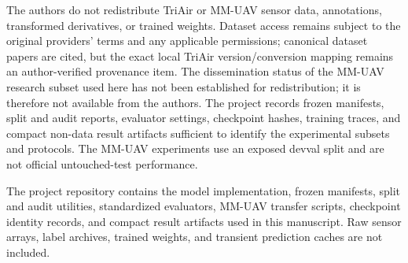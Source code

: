 The authors do not redistribute TriAir or MM-UAV sensor data, annotations, transformed derivatives, or trained weights. Dataset access remains subject to the original providers' terms and any applicable permissions; canonical dataset papers are cited, but the exact local TriAir version/conversion mapping remains an author-verified provenance item. The dissemination status of the MM-UAV research subset used here has not been established for redistribution; it is therefore not available from the authors. The project records frozen manifests, split and audit reports, evaluator settings, checkpoint hashes, training traces, and compact non-data result artifacts sufficient to identify the experimental subsets and protocols. The MM-UAV experiments use an exposed devval split and are not official untouched-test performance.

The project repository contains the model implementation, frozen manifests, split and audit utilities, standardized evaluators, MM-UAV transfer scripts, checkpoint identity records, and compact result artifacts used in this manuscript. Raw sensor arrays, label archives, trained weights, and transient prediction caches are not included.


